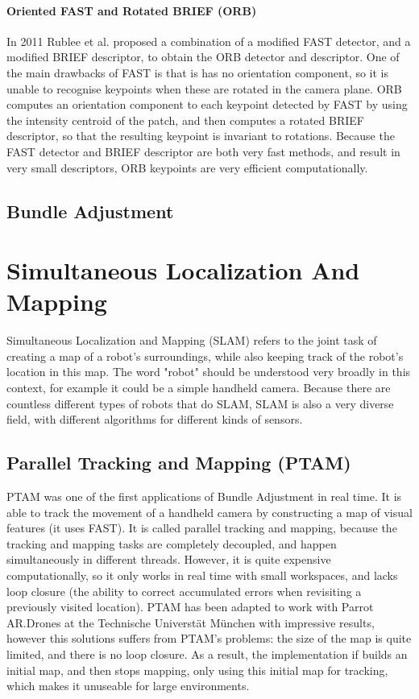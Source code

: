 \paragraph{Oriented FAST and Rotated BRIEF (ORB)}
In 2011 Rublee et al. \cite{orb} proposed a combination of a modified FAST detector, and a modified BRIEF descriptor, to obtain the ORB detector and descriptor. One of the main drawbacks of FAST is that is has no orientation component, so it is unable to recognise keypoints when these are rotated in the camera plane. ORB computes an orientation component to each keypoint detected by FAST by using the intensity centroid of the patch, and then computes a rotated BRIEF descriptor, so that the resulting keypoint is invariant to rotations. Because the FAST detector and BRIEF descriptor are both very fast methods, and result in very small descriptors, ORB keypoints are very efficient computationally.

\subsection{Bundle Adjustment}

\section{Simultaneous Localization And Mapping}
Simultaneous Localization and Mapping (SLAM) refers to the joint task of creating a map of a robot's surroundings, while also keeping track of the robot's location in this map. The word "robot" should be understood very broadly in this context, for example it could be a simple handheld camera. Because there are countless different types of robots that do SLAM, SLAM is also a very diverse field, with different algorithms for different kinds of sensors.

\subsection{Parallel Tracking and Mapping (PTAM)}
PTAM \cite{ptam} was one of the first applications of Bundle Adjustment in real time. It is able to track the movement of a handheld camera by constructing a map of visual features (it uses FAST). It is called parallel tracking and mapping, because the tracking and mapping tasks are completely decoupled, and happen simultaneously in different threads. However, it is quite expensive computationally, so it only works in real time with small workspaces, and lacks loop closure (the ability to correct accumulated errors when revisiting a previously visited location). PTAM has been adapted to work with Parrot AR.Drones at the Technische Universtät München \cite{engel2011msc} with impressive results, however this solutions suffers from PTAM's problems: the size of the map is quite limited, and there is no loop closure. As a result, the implementation if \cite{engel2011msc} builds an initial map, and then stops mapping, only using this initial map for tracking, which makes it unuseable for large environments.

